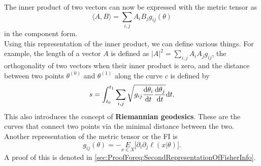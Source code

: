 The inner product of two vectors can now be expressed with the metric tensor as
\begin{equation}
	\langle A,B \rangle = \sum_{i,j} A_iB_jg_{ij}(\theta)
\end{equation}
in the component form. \\
Using this representation of the inner product, we can define various things. For example, the length of a vector $A$ is defined as $|A|^2 = \sum_{i,j} A_iA_j g_{ij}$, the orthogonality of two vectors when their inner product is zero, and the distance between two points $\theta^{(0)}$ and $\theta^{(1)}$ along the curve $c$ is defined by 
\begin{equation}
	s = \int_{t_0}^{t_1} \sum_{i,j} \sqrt{g_{ij}\frac{\mathrm{d}\theta_i}{\mathrm{d}t}\frac{\mathrm{d}\theta_j}{\mathrm{d}t}} \mathrm{d}t. 
\end{equation}
This also introduces the concept of \textbf{Riemannian geodesics}. These are the curves that connect two points via the minimal distance between the two.\\
Another representation of the metric tensor or the FI is 
\begin{equation}\label{eq:SecondRepresentationOfFisherInfo}
	g_{ij}(\theta) = - \underset{x\in X}{E} \Big[ \partial_i \partial_j \ell(x|\theta) \Big].
\end{equation}
A proof of this is denoted in \cref{sec:ProofForeq:SecondRepresentationOfFisherInfo}.

